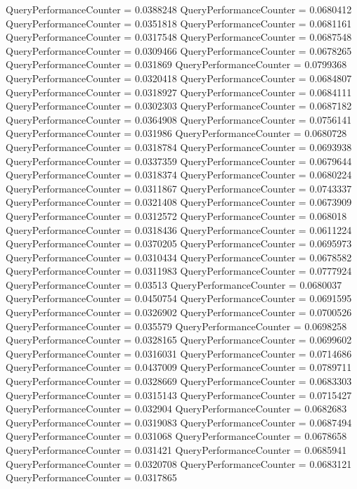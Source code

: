 \documentclass[9pt]{article}
\theoremstyle{plain}
\theoremstyle{definition}
\theoremstyle{remark}
\numberwithin{equation}{section}
\begin{document}
QueryPerformanceCounter  =  0.0388248
QueryPerformanceCounter  =  0.0680412
QueryPerformanceCounter  =  0.0351818
QueryPerformanceCounter  =  0.0681161
QueryPerformanceCounter  =  0.0317548
QueryPerformanceCounter  =  0.0687548
QueryPerformanceCounter  =  0.0309466
QueryPerformanceCounter  =  0.0678265
QueryPerformanceCounter  =  0.031869
QueryPerformanceCounter  =  0.0799368
QueryPerformanceCounter  =  0.0320418
QueryPerformanceCounter  =  0.0684807
QueryPerformanceCounter  =  0.0318927
QueryPerformanceCounter  =  0.0684111
QueryPerformanceCounter  =  0.0302303
QueryPerformanceCounter  =  0.0687182
QueryPerformanceCounter  =  0.0364908
QueryPerformanceCounter  =  0.0756141
QueryPerformanceCounter  =  0.031986
QueryPerformanceCounter  =  0.0680728
QueryPerformanceCounter  =  0.0318784
QueryPerformanceCounter  =  0.0693938
QueryPerformanceCounter  =  0.0337359
QueryPerformanceCounter  =  0.0679644
QueryPerformanceCounter  =  0.0318374
QueryPerformanceCounter  =  0.0680224
QueryPerformanceCounter  =  0.0311867
QueryPerformanceCounter  =  0.0743337
QueryPerformanceCounter  =  0.0321408
QueryPerformanceCounter  =  0.0673909
QueryPerformanceCounter  =  0.0312572
QueryPerformanceCounter  =  0.068018
QueryPerformanceCounter  =  0.0318436
QueryPerformanceCounter  =  0.0611224
QueryPerformanceCounter  =  0.0370205
QueryPerformanceCounter  =  0.0695973
QueryPerformanceCounter  =  0.0310434
QueryPerformanceCounter  =  0.0678582
QueryPerformanceCounter  =  0.0311983
QueryPerformanceCounter  =  0.0777924
QueryPerformanceCounter  =  0.03513
QueryPerformanceCounter  =  0.0680037
QueryPerformanceCounter  =  0.0450754
QueryPerformanceCounter  =  0.0691595
QueryPerformanceCounter  =  0.0326902
QueryPerformanceCounter  =  0.0700526
QueryPerformanceCounter  =  0.035579
QueryPerformanceCounter  =  0.0698258
QueryPerformanceCounter  =  0.0328165
QueryPerformanceCounter  =  0.0699602
QueryPerformanceCounter  =  0.0316031
QueryPerformanceCounter  =  0.0714686
QueryPerformanceCounter  =  0.0437009
QueryPerformanceCounter  =  0.0789711
QueryPerformanceCounter  =  0.0328669
QueryPerformanceCounter  =  0.0683303
QueryPerformanceCounter  =  0.0315143
QueryPerformanceCounter  =  0.0715427
QueryPerformanceCounter  =  0.032904
QueryPerformanceCounter  =  0.0682683
QueryPerformanceCounter  =  0.0319083
QueryPerformanceCounter  =  0.0687494
QueryPerformanceCounter  =  0.031068
QueryPerformanceCounter  =  0.0678658
QueryPerformanceCounter  =  0.031421
QueryPerformanceCounter  =  0.0685941
QueryPerformanceCounter  =  0.0320708
QueryPerformanceCounter  =  0.0683121
QueryPerformanceCounter  =  0.0317865
\end{document}
